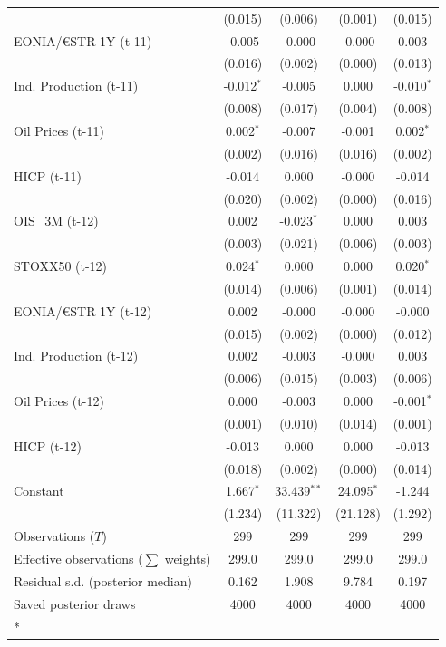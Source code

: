 \begin{longtable}[t]{lcccc}
 & (0.015) & (0.006) & (0.001) & (0.015)\\
EONIA/€STR 1Y (t-11) & -0.005 & -0.000 & -0.000 & 0.003\\
 & (0.016) & (0.002) & (0.000) & (0.013)\\
Ind. Production (t-11) & -0.012$^{*}$ & -0.005 & 0.000 & -0.010$^{*}$\\
 & (0.008) & (0.017) & (0.004) & (0.008)\\
Oil Prices (t-11) & 0.002$^{*}$ & -0.007 & -0.001 & 0.002$^{*}$\\
 & (0.002) & (0.016) & (0.016) & (0.002)\\
HICP (t-11) & -0.014 & 0.000 & -0.000 & -0.014\\
 & (0.020) & (0.002) & (0.000) & (0.016)\\
OIS\_3M (t-12) & 0.002 & -0.023$^{*}$ & 0.000 & 0.003\\
 & (0.003) & (0.021) & (0.006) & (0.003)\\
STOXX50 (t-12) & 0.024$^{*}$ & 0.000 & 0.000 & 0.020$^{*}$\\
 & (0.014) & (0.006) & (0.001) & (0.014)\\
EONIA/€STR 1Y (t-12) & 0.002 & -0.000 & -0.000 & -0.000\\
 & (0.015) & (0.002) & (0.000) & (0.012)\\
Ind. Production (t-12) & 0.002 & -0.003 & -0.000 & 0.003\\
 & (0.006) & (0.015) & (0.003) & (0.006)\\
Oil Prices (t-12) & 0.000 & -0.003 & 0.000 & -0.001$^{*}$\\
 & (0.001) & (0.010) & (0.014) & (0.001)\\
HICP (t-12) & -0.013 & 0.000 & 0.000 & -0.013\\
 & (0.018) & (0.002) & (0.000) & (0.014)\\
Constant & 1.667$^{*}$ & 33.439$^{**}$ & 24.095$^{*}$ & -1.244\\
 & (1.234) & (11.322) & (21.128) & (1.292)\\
\midrule
Observations ($T$) & 299 & 299 & 299 & 299\\
Effective observations ($\sum$ weights) & 299.0 & 299.0 & 299.0 & 299.0\\
Residual s.d. (posterior median) & 0.162 & 1.908 & 9.784 & 0.197\\
Saved posterior draws & 4000 & 4000 & 4000 & 4000\\*
\end{longtable}
\endgroup{}


